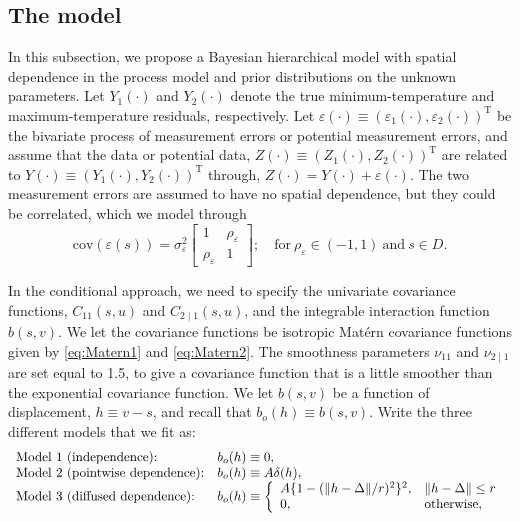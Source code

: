 \documentclass[lineno]{biometrika}
\def\T{{ \mathrm{\scriptscriptstyle T} }}
\newcommand{\Deltab} {\Delta}
\newcommand{\svec} {s}
\newcommand{\uvec} {u}
\newcommand{\h}{h}
\renewcommand{\v}{v}
\newcommand{\Yvec}{Y}
\newcommand{\Zvec}{Z}
\newcommand{\epsilonb}{\varepsilon}
\newcommand{\cov}{\mathrm{cov}}
\let\originalleft\left
\let\originalright\right
\renewcommand{\left}{\mathopen{}\mathclose\bgroup\originalleft}
\renewcommand{\right}{\aftergroup\egroup\originalright}
\begin{document}
\subsection{The model}

In this subsection, we propose a Bayesian hierarchical model with spatial dependence in the process model and  prior distributions on the unknown parameters. Let $Y_1(\cdot)$ and $Y_2(\cdot)$ denote the true minimum-temperature and maximum-temperature residuals, respectively. Let $\epsilonb(\cdot) \equiv (\varepsilon_1(\cdot),\varepsilon_2(\cdot))^\T$ be the bivariate process of measurement errors or potential measurement errors, and assume that the data or potential data, $\Zvec(\cdot) \equiv (Z_1(\cdot),Z_2(\cdot))^\T$ are related to $\Yvec(\cdot) \equiv (Y_1(\cdot),Y_2(\cdot))^\T$ through, $\Zvec(\cdot) = \Yvec(\cdot) + \epsilonb(\cdot)$. The two measurement errors are assumed to have no spatial dependence, but they could be correlated, which we model through
\begin{equation*}
\cov(\epsilonb(\svec)) = \sigma^2_\varepsilon \begin{bmatrix} 1 & \rho_\varepsilon \\ \rho_\varepsilon & 1 \end{bmatrix}; \quad \textrm{for}~ \rho_\varepsilon \in (-1,1) ~ \textrm{and} ~ \svec \in D.
\end{equation*}

In the conditional approach, we need to specify the univariate covariance functions, $C_{11}(\svec,\uvec)$ and $C_{2\mid 1}(\svec,\uvec)$, and the integrable interaction function $b(\svec,\v)$. We let the covariance functions be isotropic Mat{\'e}rn covariance functions given by \eqref{eq:Matern1} and \eqref{eq:Matern2}. The smoothness parameters $\nu_{11}$ and $\nu_{2\mid 1}$ are set equal to 1.5, to give a covariance function that is a little smoother than the exponential covariance function. We let $b(\svec,\v)$ be a function of displacement, $\h \equiv \v - \svec$, and recall that $b_o(\h) \equiv b(\svec,\v)$. Write the three different models that we fit as:
\begin{equation*}
\begin{array}{ll}
\textrm{Model 1 (independence):} &b_o(\h) \equiv 0, \\
\textrm{Model 2 (pointwise dependence):} &b_o(\h) \equiv A\delta(\h), \\
\textrm{Model 3 (diffused dependence):} &b_o(\h) \equiv \left\{\begin{array}{ll} A\{1 - (\|\h - \Deltab\|/r)^2\}^2, & \| \h - \Deltab\| \le r \\ 0, & \textrm{otherwise}, \end{array} \right. 
\end{array}
\end{equation*}
\end{document}
